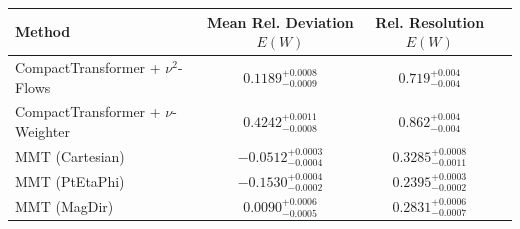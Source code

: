     \begin{tabular}{lccc}
        \toprule
        Method & Mean Rel. Deviation $E(W)$ & Rel. Resolution $E(W)$ \\
        \midrule
        CompactTransformer + $\nu^2$-Flows & $0.1189^{+0.0008}_{-0.0009}$ & $0.719^{+0.004}_{-0.004}$ \\
        CompactTransformer + $\nu$-Weighter & $0.4242^{+0.0011}_{-0.0008}$ & $0.862^{+0.004}_{-0.004}$ \\
        MMT (Cartesian) & $-0.0512^{+0.0003}_{-0.0004}$ & $0.3285^{+0.0008}_{-0.0011}$ \\
        MMT (PtEtaPhi) & $-0.1530^{+0.0004}_{-0.0002}$ & $0.2395^{+0.0003}_{-0.0002}$ \\
        MMT (MagDir) & $0.0090^{+0.0006}_{-0.0005}$ & $0.2831^{+0.0006}_{-0.0007}$ \\
        \bottomrule
    \end{tabular}